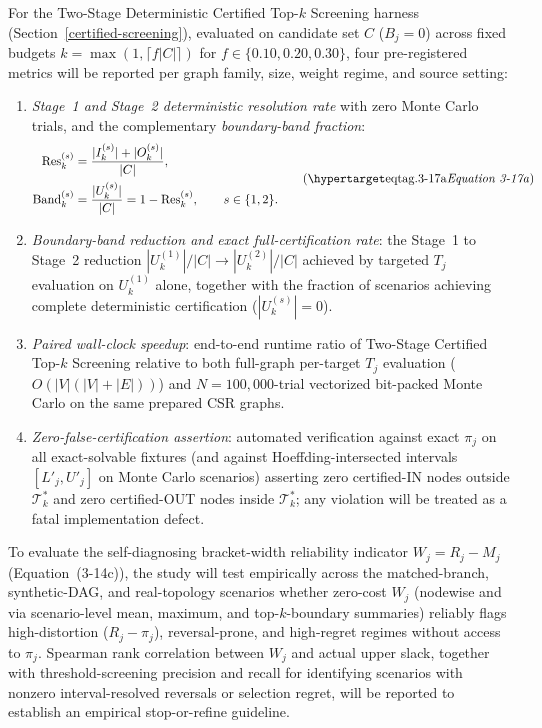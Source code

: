 For the Two-Stage Deterministic Certified Top-$k$ Screening harness
(Section~\ref{certified-screening}), evaluated on candidate set $C$
($B_j=0$) across fixed budgets $k=\max(1,\lceil f|C|\rceil)$ for
$f\in\{0.10,0.20,0.30\}$, four pre-registered metrics will be reported per
graph family, size, weight regime, and source setting:
\begin{enumerate}[label=\arabic*.,leftmargin=*]
\item \textit{Stage~1 and Stage~2 deterministic resolution rate} with zero
Monte Carlo trials, and the complementary \textit{boundary-band fraction}:
\[
\begin{aligned}
\operatorname{Res}_k^{(s)}&=\frac{|I_k^{(s)}|+|O_k^{(s)}|}{|C|},\\
\operatorname{Band}_k^{(s)}&=\frac{|U_k^{(s)}|}{|C|}=1-\operatorname{Res}_k^{(s)},
\qquad s\in\{1,2\}.
\end{aligned}
\eqtag[Two-stage certified screening resolution and boundary-band metrics]{3-17a}
\]
\item \textit{Boundary-band reduction and exact full-certification rate}:
the Stage~1 to Stage~2 reduction $|U_k^{(1)}|/|C|\to|U_k^{(2)}|/|C|$
achieved by targeted $T_j$ evaluation on $U_k^{(1)}$ alone, together with
the fraction of scenarios achieving complete deterministic certification
($|U_k^{(s)}|=0$).
\item \textit{Paired wall-clock speedup}: end-to-end runtime ratio of
Two-Stage Certified Top-$k$ Screening relative to both full-graph
per-target $T_j$ evaluation ($O(|V|(|V|+|E|))$) and $N=100{,}000$-trial
vectorized bit-packed Monte Carlo on the same prepared CSR graphs.
\item \textit{Zero-false-certification assertion}: automated verification
against exact $\pi_j$ on all exact-solvable fixtures (and against
Hoeffding-intersected intervals $[L'_j,U'_j]$ on Monte Carlo scenarios)
asserting zero certified-IN nodes outside $\mathcal{T}_k^*$ and zero
certified-OUT nodes inside $\mathcal{T}_k^*$; any violation will be treated
as a fatal implementation defect.
\end{enumerate}

To evaluate the self-diagnosing bracket-width reliability indicator
$W_j=R_j-M_j$ (Equation~(3-14c)), the study will test empirically across
the matched-branch, synthetic-DAG, and real-topology scenarios whether
zero-cost $W_j$ (nodewise and via scenario-level mean, maximum, and
top-$k$-boundary summaries) reliably flags high-distortion ($R_j-\pi_j$),
reversal-prone, and high-regret regimes without access to $\pi_j$.
Spearman rank correlation between $W_j$ and actual upper slack, together
with threshold-screening precision and recall for identifying scenarios
with nonzero interval-resolved reversals or selection regret, will be
reported to establish an empirical stop-or-refine guideline.

